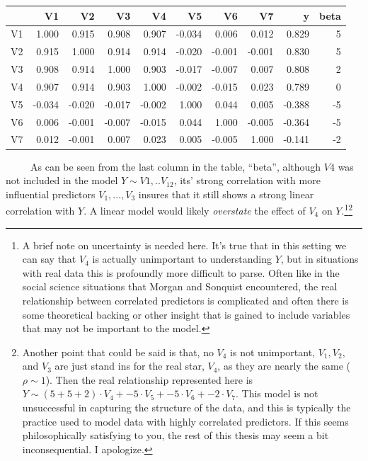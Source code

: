 \documentclass[12pt,twoside]{reedthesis}
\begin{document}
  \begin{tabular}{l|r|r|r|r|r|r|r|r|r}
  \hline
    & V1 & V2 & V3 & V4 & V5 & V6 & V7 & y & beta\\
  \hline
  V1 & 1.000 & 0.915 & 0.908 & 0.907 & -0.034 & 0.006 & 0.012 & 0.829 & 5\\
  \hline
  V2 & 0.915 & 1.000 & 0.914 & 0.914 & -0.020 & -0.001 & -0.001 & 0.830 & 5\\
  \hline
  V3 & 0.908 & 0.914 & 1.000 & 0.903 & -0.017 & -0.007 & 0.007 & 0.808 & 2\\
  \hline
  V4 & 0.907 & 0.914 & 0.903 & 1.000 & -0.002 & -0.015 & 0.023 & 0.789 & 0\\
  \hline
  V5 & -0.034 & -0.020 & -0.017 & -0.002 & 1.000 & 0.044 & 0.005 & -0.388 & -5\\
  \hline
  V6 & 0.006 & -0.001 & -0.007 & -0.015 & 0.044 & 1.000 & -0.005 & -0.364 & -5\\
  \hline
  V7 & 0.012 & -0.001 & 0.007 & 0.023 & 0.005 & -0.005 & 1.000 & -0.141 & -2\\
  \hline
  \end{tabular}
  
  ~~~~~As can be seen from the last column in the table, ``beta'',
  although \(V4\) was not included in the model \(Y \sim V1,..V_{12}\),
  its' strong correlation with more influential predictors \(V_1,...,V_3\)
  insures that it still shows a strong linear correlation with \(Y\). A
  linear model would likely \emph{overstate} the effect of \(V_4\) on
  \(Y\).\footnote{A brief note on uncertainty is needed here. It's true
    that in this setting we can say that \(V_4\) is actually unimportant
    to understanding \(Y\), but in situations with real data this is
    profoundly more difficult to parse. Often like in the social science
    situations that Morgan and Sonquist encountered, the real relationship
    between correlated predictors is complicated and often there is some
    theoretical backing or other insight that is gained to include
    variables that may not be important to the model.}\footnote{Another
    point that could be said is that, no \(V_4\) is not unimportant,
    \(V_1, V_2,\) and \(V_3\) are just stand ins for the real star,
    \(V_4\), as they are nearly the same (\(\rho \sim 1\)). Then the real
    relationship represented here is
    \(Y \sim (5 + 5 + 2) \cdot V_4 + -5 \cdot V_5 + -5 \cdot V_6 + -2 \cdot V_7\).
    This model is not unsuccessful in capturing the structure of the data,
    and this is typically the practice used to model data with highly
    correlated predictors. If this seems philosophically satisfying to
    you, the rest of this thesis may seem a bit inconsequential. I
    apologize.}
  
\end{document}
